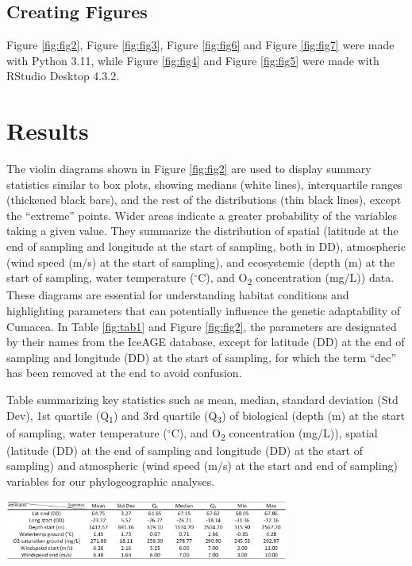{\subsection{Creating Figures}\label{Figures}
Figure \ref{fig:fig2}, Figure \ref{fig:fig3}, Figure \ref{fig:fig6} and Figure \ref{fig:fig7} were made with Python 3.11, while Figure \ref{fig:fig4} and Figure \ref{fig:fig5} were made with RStudio Desktop 4.3.2.

\section{Results}\label{results}
The violin diagrams shown in Figure \ref{fig:fig2} are used to display summary statistics similar to box plots, showing medians (white lines), interquartile ranges (thickened black bars), and the rest of the distributions (thin black lines), except the ``extreme'' points. Wider areas indicate a greater probability of the variables taking a given value. They summarize the distribution of spatial (latitude at the end of sampling and longitude at the start of sampling, both in DD), atmospheric (wind speed (m/s) at the start of sampling), and ecosystemic (depth (m) at the start of sampling, water temperature ($^\circ$C), and O\textsubscript{2} concentration (mg/L)) data. These diagrams are essential for understanding habitat conditions and highlighting parameters that can potentially influence the genetic adaptability of Cumacea. In Table \ref{fig:tab1} and Figure \ref{fig:fig2}, the parameters are designated by their names from the IceAGE database, except for latitude (DD) at the end of sampling and longitude (DD) at the start of sampling, for which the term ``dec'' has been removed at the end to avoid confusion.

\begin{table}[H]
    \centering
    \caption{Table summarizing key statistics such as mean, median, standard deviation (Std Dev), 1st quartile (Q\textsubscript{1}) and 3rd quartile (Q\textsubscript{3}) of biological (depth (m) at the start of sampling, water temperature ($^\circ$C), and O\textsubscript{2} concentration (mg/L)), spatial (latitude (DD) at the end of sampling and longitude (DD) at the start of sampling) and atmospheric (wind speed (m/s) at the start and end of sampling) variables for our phylogeographic analyses. \label{fig:tab1}}
    \includegraphics[width=0.7\textwidth]{Table_Attributes_Data.png}
\end{table}

}
